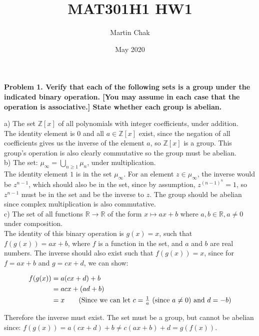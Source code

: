 \documentclass[20pt]{article}
\title{MAT301H1 HW1}
\author{Martin Chak}
\date{May 2020}
\begin{document}
\noindent
\textbf{Problem 1. Verify that each of the following sets is a group under the indicated binary operation. [You may assume in each case that the operation is associative.] State whether
each group is abelian.}\\
\begin{text}
    \noindent
    a) The set $\mathbb{Z}[x]$ of all polynomials with integer coefficients, under addition.\\
    
    The identity element is $0$ and all $a \in \mathbb{Z}[x]$ exist, since the negation of all coefficients gives us the inverse of the element $a$, so $\mathbb{Z}[x]$ is a group. This group's operation is also clearly commutative so the group must be abelian.\\

    \noindent
    b) The set: $\mu_{\infty} = \bigcup_{n \geq 1}\mu_{n}$, under multiplication.\\
    
    The identity element $1$ is in the set $\mu_{\infty}$. For an element $z \in \mu_{\infty}$, the inverse would be $z^{n-1}$, which should also be in the set, since by assumption, $z^{(n-1)^{n}} = 1$, so $z^{n - 1}$ must be in the set and be the inverse to $z$. The group should be abelian since complex multiplication is also commutative.\\
    
    \noindent
    c) The set of all functions $\mathbb{R} \longrightarrow \mathbb{R}$ of the form $x \longmapsto ax + b$ where $a, b \in \mathbb{R}, a \neq 0$ under composition.\\
    
    The identity of this binary operation is $g(x) = x$, such that $f(g(x)) = ax + b$, where $f$ is a function in the set, and $a$ and $b$ are real numbers. The inverse should also exist such that $f(g(x)) = x$, since for $f = ax + b$ and $g = cx + d$, we can show:
    
    \begin{align}
        f(g(x)) &= a(cx + d) + b\nonumber\\
        &= acx + (ad + b)\nonumber\\
        &= x\tag{Since we can let $c = \frac{1}{a}$ (since $a \neq 0$) and $d = -b$}
    \end{align}
    
    Therefore the inverse must exist. The set must be a group, but cannot be abelian since: $f(g(x)) = a(cx + d) + b \neq c(ax + b) + d = g(f(x))$.\\
    

\end{text}
\end{document}
